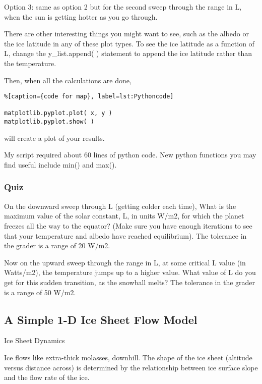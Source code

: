 Option 3: same as option 2 but for the second sweep through the range in L, when the sun is getting hotter as you go through.

There are other interesting things you might want to see, such as the albedo or the ice latitude in any of these plot types. To see the ice latitude as a function of L, change the y_list.append( ) statement to append the ice latitude rather than the temperature.

Then, when all the calculations are done,


\begin{lstlisting}%[caption={code for map}, label=lst:Pythoncode]

matplotlib.pyplot.plot( x, y )
matplotlib.pyplot.show( )
\end{lstlisting}

will create a plot of your results.

My script required about 60 lines of python code. New python functions you may find useful include min() and max().


\subsubsection{Quiz}\index{}


On the downward sweep through L (getting colder each time), What is the maximum value of the solar constant, L, in units W/m2, for which the planet freezes all the way to the equator? (Make sure you have enough iterations to see that your temperature and albedo have reached equilibrium). The tolerance in the grader is a range of 20 W/m2.


Now on the upward sweep through the range in L, at some critical L value (in Watts/m2), the temperature jumps up to a higher value. What value of L do you get for this sudden transition, as the snowball melts? The tolerance in the grader is a range of 50 W/m2.



\subsection{A Simple 1-D Ice Sheet Flow Model}

Ice Sheet Dynamics

Ice flows like extra-thick molasses, downhill. The shape of the ice sheet (altitude versus distance across) is determined by the relationship between ice surface slope and the flow rate of the ice.


